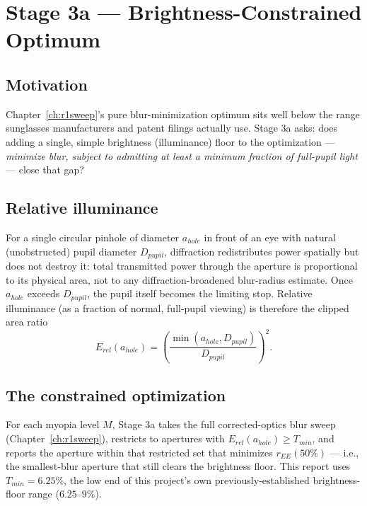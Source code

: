 \chapter{Stage 3a --- Brightness-Constrained Optimum}
\label{ch:stage3a}

\section{Motivation}

Chapter~\ref{ch:r1sweep}'s pure blur-minimization optimum sits well below the range
sunglasses manufacturers and patent filings actually use. Stage 3a asks: does adding a
single, simple brightness (illuminance) floor to the optimization --- \emph{minimize
blur, subject to admitting at least a minimum fraction of full-pupil light} --- close
that gap?

\section{Relative illuminance}

For a single circular pinhole of diameter $a_{hole}$ in front of an eye with natural
(unobstructed) pupil diameter $D_{pupil}$, diffraction redistributes power spatially
but does not destroy it: total transmitted power through the aperture is proportional
to its physical area, not to any diffraction-broadened blur-radius estimate. Once
$a_{hole}$ exceeds $D_{pupil}$, the pupil itself becomes the limiting stop. Relative
illuminance (as a fraction of normal, full-pupil viewing) is therefore the clipped
area ratio
\begin{equation}
E_{rel}(a_{hole}) = \left(\frac{\min(a_{hole}, D_{pupil})}{D_{pupil}}\right)^{2}.
\label{eq:erel}
\end{equation}

\section{The constrained optimization}

For each myopia level $M$, Stage 3a takes the full corrected-optics blur sweep
(Chapter~\ref{ch:r1sweep}), restricts to apertures with $E_{rel}(a_{hole}) \ge T_{min}$,
and reports the aperture within that restricted set that minimizes $r_{EE}(50\%)$ ---
i.e., the smallest-blur aperture that still clears the brightness floor. This report
uses $T_{min}=6.25\%$, the low end of this project's own previously-established
brightness-floor range ($6.25$--$9\%$).

